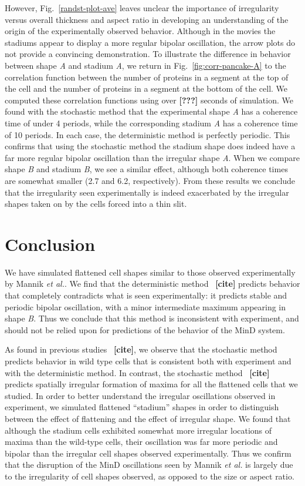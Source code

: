 \documentclass[letterpaper,twocolumn,amsmath,amssymb,pre]{revtex4-1}
\newcommand{\red}[1]{{\bf \color{red} #1}}
\newcommand{\fixme}[1]{\red{[#1]}}
\begin{document}
However, Fig.~\ref{randst-plot-ave} leaves unclear the importance of
irregularity versus overall thickness and aspect ratio in developing
an understanding of the origin of the experimentally observed
behavior.  Although in the movies the stadiums appear to display a
more regular bipolar oscillation, the arrow plots do not provide a
convincing demonstration.  To illustrate the difference in behavior
between shape \emph{A} and stadium \emph{A}, we return in
Fig.~\ref{fig:corr-pancake-A} to the correlation function between the
number of proteins in a segment at the top of the cell and the number
of proteins in a segment at the bottom of the cell.  We computed these
correlation functions using over \fixme{???} seconds of simulation.
We found with the stochastic method that the experimental shape
\emph{A} has a coherence time of under 4 periods, while the
corresponding stadium \emph{A} has a coherence time of 10 periods.  In
each case, the deterministic method is perfectly periodic. This
confirms that using the stochastic method the stadium shape does
indeed have a far more regular bipolar oscillation than the irregular
shape \emph{A}.  When we compare shape \emph{B} and stadium \emph{B},
we see a similar effect, although both coherence times are somewhat
smaller (2.7 and 6.2, respectively).  From these results we conclude
that the irregularity seen experimentally is indeed exacerbated by the
irregular shapes taken on by the cells forced into a thin slit.

\section{Conclusion}
We have simulated flattened cell shapes similar to those observed
experimentally by Mannik \emph{et al.}.  We find that the
deterministic method~\fixme{cite} predicts behavior that completely
contradicts what is seen experimentally: it predicts stable and
periodic bipolar oscillation, with a minor intermediate maximum
appearing in shape \emph{B}.  Thus we conclude that this method is
inconsistent with experiment, and should not be relied upon for
predictions of the behavior of the MinD system.

As found in previous studies~\fixme{cite}, we observe that the
stochastic method predicts behavior in wild type cells that is
consistent both with experiment and with the deterministic method.  In
contrast, the stochastic method~\fixme{cite} predicts spatially
irregular formation of maxima for all the flattened cells that we
studied.  In order to better understand the irregular oscillations
observed in experiment, we simulated flattened ``stadium'' shapes in
order to distinguish between the effect of flattening and the effect
of irregular shape.  We found that although the stadium cells
exhibited somewhat more irregular locations of maxima than the
wild-type cells, their oscillation was far more periodic and bipolar
than the irregular cell shapes observed experimentally.  Thus we
confirm that the disruption of the MinD oscillations seen by Mannik
\emph{et al.} is largely due to the irregularity of cell shapes
observed, as opposed to the size or aspect ratio.
\end{document}

